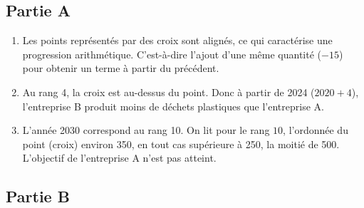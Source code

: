 \subsection*{Partie A}
\begin{enumerate}
  \item
Les points représentés par des croix sont alignés, ce qui caractérise une progression arithmétique. C'est-à-dire l'ajout d'une même quantité ($-15$) pour obtenir un terme à partir du précédent.

  \item
Au rang 4, la croix est au-dessus du point. Donc à partir de 2024 ($2020+4$), l'entreprise B produit moins de déchets plastiques que l'entreprise A.

  \item
L'année 2030 correspond au rang 10. On lit pour le rang $10$, l'ordonnée du point (croix) environ 350, en tout cas supérieure à 250, la moitié de 500. L'objectif de l'entreprise A n'est pas atteint.


\end{enumerate}

\subsection*{Partie B}

